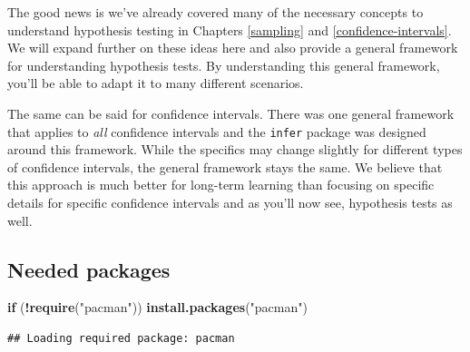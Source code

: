 \documentclass[
]{book}
\newenvironment{Shaded}{\begin{snugshade}}{\end{snugshade}}
\newcommand{\CommentTok}[1]{\textcolor[rgb]{0.56,0.35,0.01}{\textit{#1}}}
\newcommand{\ControlFlowTok}[1]{\textcolor[rgb]{0.13,0.29,0.53}{\textbf{#1}}}
\newcommand{\KeywordTok}[1]{\textcolor[rgb]{0.13,0.29,0.53}{\textbf{#1}}}
\newcommand{\NormalTok}[1]{#1}
\newcommand{\OperatorTok}[1]{\textcolor[rgb]{0.81,0.36,0.00}{\textbf{#1}}}
\newcommand{\StringTok}[1]{\textcolor[rgb]{0.31,0.60,0.02}{#1}}
\begin{document}
The good news is we've already covered many of the necessary concepts to understand hypothesis testing in Chapters \ref{sampling} and \ref{confidence-intervals}. We will expand further on these ideas here and also provide a general framework for understanding hypothesis tests. By understanding this general framework, you'll be able to adapt it to many different scenarios.

The same can be said for confidence intervals. There was one general framework that applies to \emph{all} confidence intervals and the \texttt{infer} package was designed around this framework. While the specifics may change slightly for different types of confidence intervals, the general framework stays the same. We believe that this approach is much better for long-term learning than focusing on specific details for specific confidence intervals and as you'll now see, hypothesis tests as well.

\hypertarget{needed-packages}{%
\subsection*{Needed packages}\label{needed-packages}}

\begin{Shaded}
\begin{Highlighting}[]
\ControlFlowTok{if}\NormalTok{ (}\OperatorTok{!}\KeywordTok{require}\NormalTok{(}\StringTok{"pacman"}\NormalTok{)) }\KeywordTok{install.packages}\NormalTok{(}\StringTok{"pacman"}\NormalTok{)}
\end{Highlighting}
\end{Shaded}

\begin{verbatim}
## Loading required package: pacman
\end{verbatim}

\begin{Shaded}
\end{Shaded}
\end{document}

